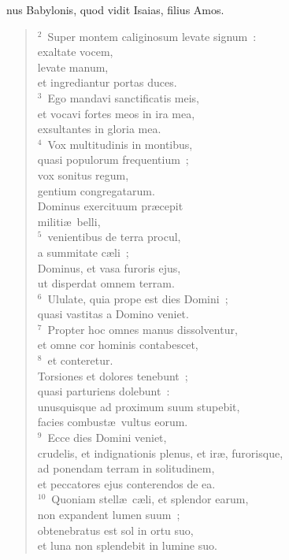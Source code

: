 \bchapter
{}nus Babylonis, quod vidit Isaias, filius Amos.
\begin{verse}${}^{2}$~Super montem caliginosum levate signum~:\\ exaltate vocem,\\ levate manum,\\ et ingrediantur portas duces.\\
${}^{3}$~Ego mandavi sanctificatis meis,\\ et vocavi fortes meos in ira mea,\\ exsultantes in gloria mea.\\
${}^{4}$~Vox multitudinis in montibus,\\ quasi populorum frequentium~;\\ vox sonitus regum,\\ gentium congregatarum.\\ Dominus exercituum pr\ae cepit\\ militi\ae\ belli,\\
${}^{5}$~venientibus de terra procul,\\ a summitate c\ae li~;\\ Dominus, et vasa furoris ejus,\\ ut disperdat omnem terram.\\
${}^{6}$~Ululate, quia prope est dies Domini~;\\ quasi vastitas a Domino veniet.\\
${}^{7}$~Propter hoc omnes manus dissolventur,\\ et omne cor hominis contabescet,\\
${}^{8}$~et conteretur.\\ Torsiones et dolores tenebunt~;\\ quasi parturiens dolebunt~:\\ unusquisque ad proximum suum stupebit,\\ facies combust\ae\ vultus eorum.\\
${}^{9}$~Ecce dies Domini veniet,\\ crudelis, et indignationis plenus, et ir\ae , furorisque,\\ ad ponendam terram in solitudinem,\\ et peccatores ejus conterendos de ea.\\
${}^{10}$~Quoniam stell\ae\ c\ae li, et splendor earum,\\ non expandent lumen suum~;\\ obtenebratus est sol in ortu suo,\\ et luna non splendebit in lumine suo.\\

\end{verse}
